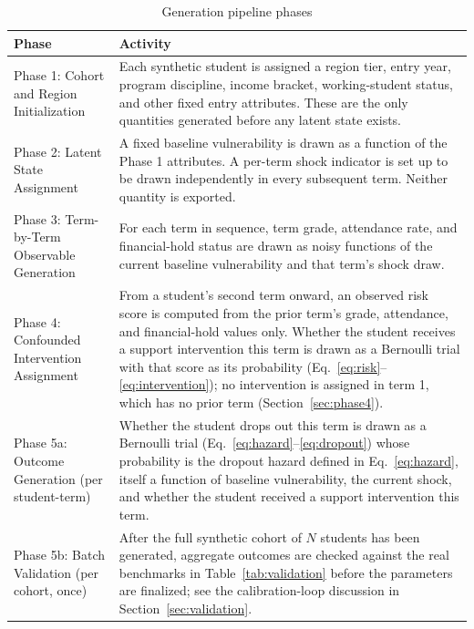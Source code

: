 \documentclass[11pt]{article}
\begin{document}
\begin{table}[htbp]
\caption{Generation pipeline phases}
\label{tab:phases}
\centering
\small
\renewcommand{\arraystretch}{1.2}
\begin{tabular}{@{}p{}p{}@{}}
\toprule
\textbf{Phase} & \textbf{Activity} \\
\midrule
Phase 1: Cohort and Region Initialization & Each synthetic student is assigned a region tier, entry year, program discipline, income bracket, working-student status, and other fixed entry attributes. These are the only quantities generated before any latent state exists. \\
\addlinespace
Phase 2: Latent State Assignment & A fixed baseline vulnerability is drawn as a function of the Phase 1 attributes. A per-term shock indicator is set up to be drawn independently in every subsequent term. Neither quantity is exported. \\
\addlinespace
Phase 3: Term-by-Term Observable Generation & For each term in sequence, term grade, attendance rate, and financial-hold status are drawn as noisy functions of the current baseline vulnerability and that term's shock draw. \\
\addlinespace
Phase 4: Confounded Intervention Assignment & From a student's second term onward, an observed risk score is computed from the prior term's grade, attendance, and financial-hold values only. Whether the student receives a support intervention this term is drawn as a Bernoulli trial with that score as its probability (Eq.~\ref{eq:risk}--\ref{eq:intervention}); no intervention is assigned in term 1, which has no prior term (Section~\ref{sec:phase4}). \\
\addlinespace
Phase 5a: Outcome Generation (per student-term) & Whether the student drops out this term is drawn as a Bernoulli trial (Eq.~\ref{eq:hazard}--\ref{eq:dropout}) whose probability is the dropout hazard defined in Eq.~\ref{eq:hazard}, itself a function of baseline vulnerability, the current shock, and whether the student received a support intervention this term. \\
\addlinespace
Phase 5b: Batch Validation (per cohort, once) & After the full synthetic cohort of $N$ students has been generated, aggregate outcomes are checked against the real benchmarks in Table~\ref{tab:validation} before the parameters are finalized; see the calibration-loop discussion in Section~\ref{sec:validation}. \\
\bottomrule
\end{tabular}
\end{table}
\end{document}
